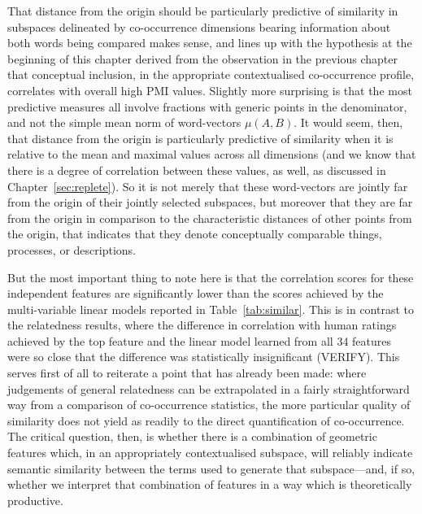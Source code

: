 That distance from the origin should be particularly predictive of similarity in subspaces delineated by co-occurrence dimensions bearing information about both words being compared makes sense, and lines up with the hypothesis at the beginning of this chapter derived from the observation in the previous chapter that conceptual inclusion, in the appropriate contextualised co-occurrence profile, correlates with overall high PMI values.  Slightly more surprising is that the most predictive measures all involve fractions with generic points in the denominator, and not the simple mean norm of word-vectors $\mu(A,B)$.  It would seem, then, that distance from the origin is particularly predictive of similarity when it is relative to the mean and maximal values across all dimensions (and we know that there is a degree of correlation between these values, as well, as discussed in Chapter~\ref{sec:replete}).  So it is not merely that these word-vectors are jointly far from the origin of their jointly selected subspaces, but moreover that they are far from the origin in comparison to the characteristic distances of other points from the origin, that indicates that they denote conceptually comparable things, processes, or descriptions.

But the most important thing to note here is that the correlation scores for these independent features are significantly lower than the scores achieved by the multi-variable linear models reported in Table~\ref{tab:similar}.  This is in contrast to the relatedness results, where the difference in correlation with human ratings achieved by the top feature and the linear model learned from all 34 features were so close that the difference was statistically insignificant (VERIFY).  This serves first of all to reiterate a point that has already been made: where judgements of general relatedness can be extrapolated in a fairly straightforward way from a comparison of co-occurrence statistics, the more particular quality of similarity does not yield as readily to the direct quantification of co-occurrence.  The critical question, then, is whether there is a combination of geometric features which, in an appropriately contextualised subspace, will reliably indicate semantic similarity between the terms used to generate that subspace---and, if so, whether we interpret that combination of features in a way which is theoretically productive.


